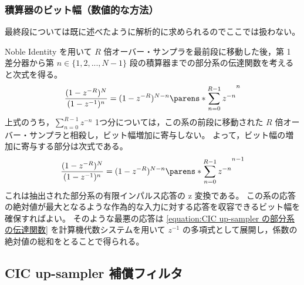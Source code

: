         \subsubsection{積算器のビット幅（数値的な方法）}
            最終段については既に述べたように解析的に求められるのでここでは扱わない。
            \par
            Noble Identity を用いて $R$ 倍オーバー・サンプラを最前段に移動した後，第 1 差分器から第 $n\in\{1,2,...,N-1\}$ 段の積算器までの部分系の伝達関数を考えると次式を得る。
            \[ \frac{(1-z^{-R})^N}{(1-z^{-1})^n} = (1-z^{-R})^{N-n}\parens*{\sum_{n=0}^{R-1} z^{-n}}^n \]
            上式のうち，$\sum_{n=0}^{R-1} z^{-n}$ 1つ分については，この系の前段に移動された $R$ 倍オーバー・サンプラと相殺し，ビット幅増加に寄与しない。
            よって，ビット幅の増加に寄与する部分は次式である。
            \begin{equation}
                \frac{(1-z^{-R})^N}{(1-z^{-1})^n} = (1-z^{-R})^{N-n}\parens*{\sum_{n=0}^{R-1} z^{-n}}^{n-1} \label{equation:CIC up-sampler の部分系の伝達関数}
            \end{equation}
            これは抽出された部分系の有限インパルス応答の z 変換である。
            この系の応答の絶対値が最大となるような作為的な入力に対する応答を収容できるビット幅を確保すればよい。
            そのような最悪の応答は \cref{equation:CIC up-sampler の部分系の伝達関数} を計算機代数システムを用いて $z^{-1}$ の多項式として展開し，係数の絶対値の総和をとることで得られる。
    \subsection{CIC up-sampler 補償フィルタ}
        \newcommand*{\HCNF}{H_\text{C,NF}}

